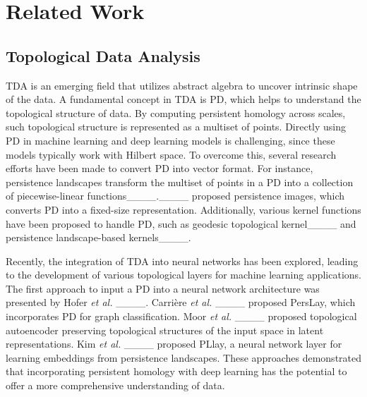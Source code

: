 \section{Related Work}
\subsection{Topological Data Analysis}
TDA is an emerging field that utilizes abstract algebra to uncover intrinsic shape of the data. A fundamental concept in TDA is PD, which helps to understand the topological structure of data. By computing persistent homology across scales, such topological structure is represented as a multiset of points. Directly using PD in machine learning and deep learning models is challenging, since these models typically work with Hilbert space. To overcome this, several research efforts have been made to convert PD into vector format. For instance, persistence landscapes transform the multiset of points in a PD into a collection of piecewise-linear functions____.____ proposed persistence images, which converts PD into a fixed-size representation. Additionally, various kernel functions have been proposed to handle PD, such as geodesic topological kernel____ and persistence landscape-based kernels____.

Recently, the integration of TDA into neural networks has been explored, leading to the development of various topological layers for machine learning applications. The first approach to input a PD into a neural network architecture was presented by Hofer \textit{et al.} ____. Carrière \textit{et al.} ____ proposed PersLay, which incorporates PD for graph classification. Moor \textit{et al.} ____ proposed topological autoencoder preserving topological structures of the input space in latent representations. Kim \textit{et al.} ____ proposed PLlay, a neural network layer for learning embeddings from persistence landscapes. These approaches demonstrated that incorporating persistent homology with deep learning has the potential to offer a more comprehensive understanding of data. %

